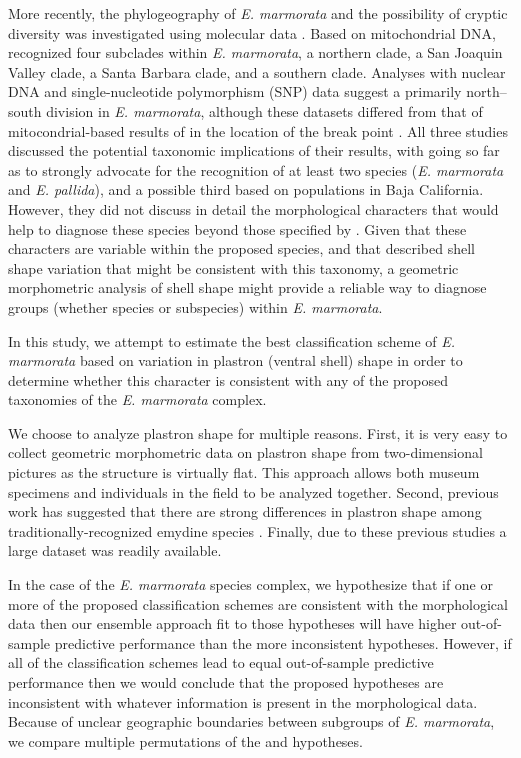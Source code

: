\documentclass[12pt,letterpaper]{article}
\begin{document}
More recently, the phylogeography of \textit{E. marmorata} and the possibility of cryptic diversity was investigated using molecular data \citep{Spinks2005,Spinks2010,Spinks2014}. Based on mitochondrial DNA, \citet{Spinks2005} recognized four subclades within \textit{E. marmorata}, a northern clade, a San Joaquin Valley clade, a Santa Barbara clade, and a southern clade. Analyses with nuclear DNA \citep{Spinks2010} and single-nucleotide polymorphism (SNP) data suggest a primarily north--south division in \textit{E. marmorata}, although these datasets differed from that of mitocondrial-based results of \citet{Spinks2005} in the location of the break point \citep{Spinks2014}. All three studies discussed the potential taxonomic implications of their results, with \citet{Spinks2014} going so far as to strongly advocate for the recognition of at least two species (\emph{E. marmorata} and \emph{E. pallida}), and a possible third based on populations in Baja California. However, they did not discuss in detail the morphological characters that would help to diagnose these species beyond those specified by \citet{Seeliger1945}. Given that these characters are variable within the proposed species, and that \citet{Holland1992} described shell shape variation that might be consistent with this taxonomy, a geometric morphometric analysis of shell shape might provide a reliable way to diagnose groups (whether species or subspecies) within \textit{E. marmorata}.

In this study, we attempt to estimate the best classification scheme of \textit{E. marmorata} based on variation in plastron (ventral shell) shape in order to determine whether this character is consistent with any of the proposed taxonomies of the \textit{E. marmorata} complex. 

We choose to analyze plastron shape for multiple reasons. First, it is very easy to collect geometric morphometric data on plastron shape from two-dimensional pictures as the structure is virtually flat. This approach allows both museum specimens and individuals in the field to be analyzed together. Second, previous work has suggested that there are strong differences in plastron shape among traditionally-recognized emydine species \citep{Angielczyk2007,Angielczyk2011,Angielczyk2013a}. Finally, due to these previous studies a large dataset was readily available.

In the case of the \textit{E. marmorata} species complex, we hypothesize that if one or more of the proposed classification schemes are consistent with the morphological data then our ensemble approach fit to those hypotheses will have higher out-of-sample predictive performance than the more inconsistent hypotheses. However, if all of the classification schemes lead to equal out-of-sample predictive performance then we would conclude that the proposed hypotheses are inconsistent with whatever information is present in the morphological data. Because of unclear geographic boundaries between subgroups of \textit{E. marmorata}, we compare multiple permutations of the \citep{Spinks2010} and \citet{Spinks2014} hypotheses.
\end{document}
